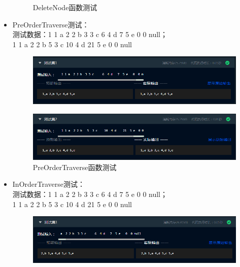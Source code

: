 \documentclass[supercite]{Experimental_Report}
\theoremstyle{definition}
\begin{document}
\begin{itemize}
\begin{figure}[htbp]
\begin{minipage}{0.9\linewidth}
		      \end{minipage}
		      \caption{DeleteNode函数测试}
		      \label{fig2-12}
	      \end{figure}
	\item PreOrderTraverse测试：\\测试数据：1 1 a  2 2 b  3 3 c     6  4 d   7  5 e   0  0 null；\\1 1 a  2 2 b   5  3 c    10  4 d    21  5 e  0 0 null
	      \begin{figure}[htbp]
		      \centering
		      \begin{minipage}{0.9\linewidth}
			      \centering
			      \includegraphics[width=0.9\linewidth]{images/test-81.png}
		      \end{minipage}
	      \end{figure}
	      \newpage
	      \begin{figure}[htbp]
		      \centering
		      \begin{minipage}{0.9\linewidth}
			      \centering
			      \includegraphics[width=0.9\linewidth]{images/test-82.png}
		      \end{minipage}
		      \caption{PreOrderTraverse函数测试}
		      \label{fig2-13}
	      \end{figure}
	\item InOrderTraverse测试：\\测试数据：1 1 a  2 2 b  3 3 c     6  4 d   7  5 e   0  0 null；\\1 1 a  2 2 b   5  3 c    10  4 d    21  5 e  0 0 null
	      \begin{figure}[htbp]
		      \centering
		      \begin{minipage}{0.9\linewidth}
			      \centering
			      \includegraphics[width=0.9\linewidth]{images/test-83.png}

\end{minipage}
\end{figure}
\end{itemize}
\end{document}
